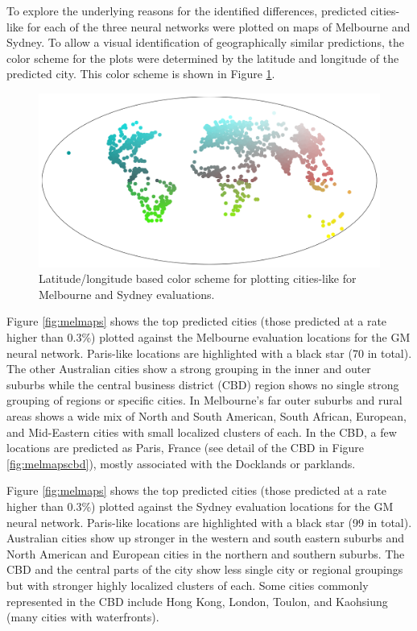 \documentclass[sageh,times]{sagej}
\begin{document}
To explore the underlying reasons for the identified differences, predicted cities-like for each of the three neural networks were plotted on maps of Melbourne and Sydney. To allow a visual identification of geographically similar predictions, the color scheme for the plots were determined by the latitude and longitude of the predicted city. This color scheme is shown in Figure \ref{fig:colorscheme}. 


\begin{figure}[!htbp]
\centering    
\includegraphics[scale=0.25]{Images/World_map_color_scheme.png} 
\caption{Latitude/longitude based color scheme for plotting cities-like for Melbourne and Sydney evaluations.}    
 \label{fig:colorscheme}  
\end{figure} 


Figure \ref{fig:melmaps} shows the top predicted cities (those predicted at a rate higher than 0.3\%) plotted against the Melbourne evaluation locations for the GM neural network. Paris-like locations are highlighted with a black star (70 in total). The other Australian cities show a strong grouping in the inner and outer suburbs while the central business district (CBD) region shows no single strong grouping of regions or specific cities. In Melbourne's far outer suburbs and rural areas shows a wide mix of North and South American, South African, European, and Mid-Eastern cities with small localized clusters of each. In the CBD, a few locations are predicted as Paris, France (see detail of the CBD in Figure \ref{fig:melmapscbd}), mostly associated with the Docklands or parklands.

Figure \ref{fig:melmaps} shows the top predicted cities (those predicted at a rate higher than 0.3\%) plotted against the Sydney evaluation locations for the GM neural network. Paris-like locations are highlighted with a black star (99 in total).  Australian cities show up stronger in the western and south eastern suburbs and North American and European cities in the northern and southern suburbs. The CBD and the central parts of the city show less single city or regional groupings but with stronger highly localized clusters of each. Some cities commonly represented in the CBD include Hong Kong, London, Toulon, and Kaohsiung (many cities with waterfronts). 
\end{document}
